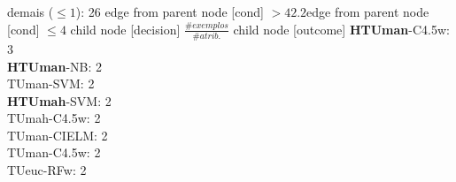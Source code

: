 {{{{%
demais ($\leq 1$): 26} edge from parent node [cond] {$>42.2$}}edge from parent node [cond] {$\leq4$}}
child {node [decision] {$\frac{\#exemplos}{\#atrib.}$}
child {node [outcome] {
\textbf{HTUman}-C4.5w: 3\\
\textbf{HTUman}-NB: 2\\
TUman-SVM: 2\\
\textbf{HTUmah}-SVM: 2\\
TUmah-C4.5w: 2\\
TUman-CIELM: 2\\
TUman-C4.5w: 2\\
TUeuc-RFw: 2\\
}}}}
